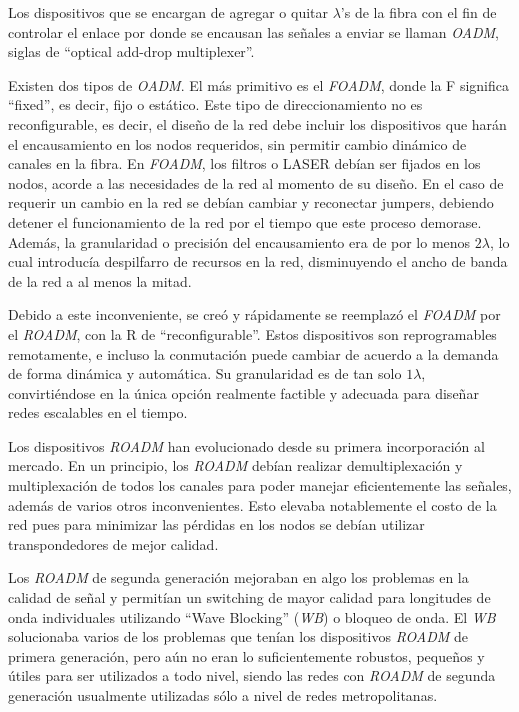 Los dispositivos que se encargan de agregar o quitar $\lambda$'s de la
fibra con el fin de controlar el enlace por donde se encausan las
señales a enviar se llaman \emph{OADM}, siglas de ``optical add-drop
multiplexer''.

Existen dos tipos de \emph{OADM}. El más primitivo es el \emph{FOADM},
donde la F significa ``fixed'', es decir, fijo o estático. Este tipo
de direccionamiento no es reconfigurable, es decir, el diseño de la
red debe incluir los dispositivos que harán el encausamiento en los
nodos requeridos, sin permitir cambio dinámico de canales en la
fibra. En \emph{FOADM}, los filtros o LASER debían ser fijados en los
nodos, acorde a las necesidades de la red al momento de su diseño. En
el caso de requerir un cambio en la red se debían cambiar y reconectar
jumpers, debiendo detener el funcionamiento de la red por el tiempo
que este proceso demorase. Además, la granularidad o precisión del
encausamiento era de por lo menos $2\lambda$, lo cual introducía
despilfarro de recursos en la red, disminuyendo el ancho de banda de
la red a al menos la mitad.

Debido a este inconveniente, se creó y rápidamente se reemplazó el
\emph{FOADM} por el \emph{ROADM}, con la R de
``reconfigurable''. Estos dispositivos son reprogramables remotamente,
e incluso la conmutación puede cambiar de acuerdo a la demanda de
forma dinámica y automática. Su granularidad es de tan solo
$1\lambda$, convirtiéndose en la única opción realmente factible y
adecuada para diseñar redes escalables en el tiempo.

Los dispositivos \emph{ROADM} han evolucionado desde su primera
incorporación al mercado\cite{roadmevolves}. En un principio, los 
\emph{ROADM} debían realizar demultiplexación y multiplexación de
todos los canales para poder manejar eficientemente las señales,
además de varios otros inconvenientes. Esto elevaba notablemente el 
costo de la red pues para minimizar las pérdidas en los nodos se 
debían utilizar transpondedores de mejor calidad.

Los \emph{ROADM} de segunda generación mejoraban en algo los problemas
en la calidad de señal y permitían un switching de mayor calidad para
longitudes de onda individuales utilizando ``Wave Blocking'' (\emph{WB})
o bloqueo de onda. El \emph{WB} solucionaba varios de los problemas que
tenían los dispositivos \emph{ROADM} de primera generación, pero aún no
eran lo suficientemente robustos, pequeños y útiles para ser utilizados
a todo nivel, siendo las redes con \emph{ROADM} de segunda generación 
usualmente utilizadas sólo a nivel de redes metropolitanas.

